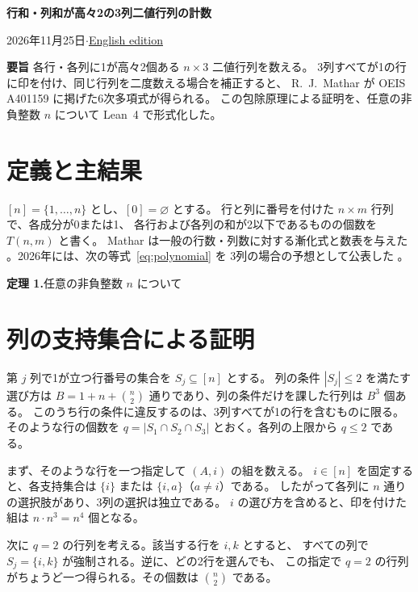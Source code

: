\documentclass[a4paper,10pt]{ltjsarticle}
\newcommand{\rows}{[n]}
\begin{document}
\begin{center}
  {\LARGE\bfseries 行和・列和が高々2の3列二値行列の計数\par}
  \vspace{5pt}
  {\small 2026年11月25日\quad$\cdot$\quad\href{https://github.com/nktkt/math/blob/main/output/pdf/three-columns.pdf}{English edition}\par}
\end{center}
\smallskip

\noindent\textbf{要旨}\quad
各行・各列に1が高々2個ある $n\times3$ 二値行列を数える。
3列すべてが1の行に印を付け、同じ行列を二度数える場合を補正すると、
R.~J.~Mathar が OEIS A401159 に掲げた6次多項式が得られる。
この包除原理による証明を、任意の非負整数 $n$ について Lean~4 で形式化した。

\section{定義と主結果}
$\rows=\{1,\ldots,n\}$ とし、$[0]=\varnothing$ とする。
行と列に番号を付けた $n\times m$ 行列で、各成分が0または1、
各行および各列の和が2以下であるものの個数を $T(n,m)$ と書く。
Mathar は一般の行数・列数に対する漸化式と数表を与えた
\cite[第2節、表2]{mathar2014}。2026年には、次の等式~\eqref{eq:polynomial} を
3列の場合の予想として公表した \cite{oeis}。

\smallskip
\noindent\textbf{定理 1.}\quad 任意の非負整数 $n$ について
\threeColumnIdentities

\section{列の支持集合による証明}
第 $j$ 列で1が立つ行番号の集合を $S_j\subseteq\rows$ とする。
列の条件 $|S_j|\leq 2$ を満たす選び方は
$B=1+n+\binom n2$ 通りであり、列の条件だけを課した行列は $B^3$ 個ある。
このうち行の条件に違反するのは、3列すべてが1の行を含むものに限る。
そのような行の個数を $q=|S_1\cap S_2\cap S_3|$ とおく。各列の上限から $q\leq 2$ である。

まず、そのような行を一つ指定して $(A,i)$ の組を数える。
$i\in\rows$ を固定すると、各支持集合は $\{i\}$ または $\{i,a\}$（$a\ne i$）である。
したがって各列に $n$ 通りの選択肢があり、3列の選択は独立である。
$i$ の選び方を含めると、印を付けた組は $n\cdot n^3=n^4$ 個となる。

次に $q=2$ の行列を考える。該当する行を $i,k$ とすると、
すべての列で $S_j=\{i,k\}$ が強制される。逆に、どの2行を選んでも、
この指定で $q=2$ の行列がちょうど一つ得られる。その個数は $\binom n2$ である。
\end{document}
